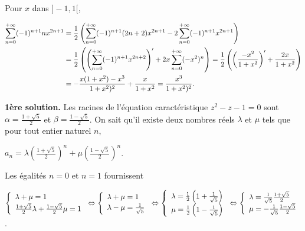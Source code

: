 {{Pour $x$ dans $]-1,1[$,

\begin{align*}\ensuremath
\sum_{n=0}^{+\infty}(-1)^{n+1}nx^{2n+1}&=\frac{1}{2}\left(\sum_{n=0}^{+\infty}(-1)^{n+1}(2n+2)x^{2n+1}-2\sum_{n=0}^{+\infty}(-1)^{n+1}x^{2n+1}\right)\\ 
 &=\frac{1}{2}\left(\left(\sum_{n=0}^{+\infty}(-1)^{n+1}x^{2n+2}\right)'+2x\sum_{n=0}^{+\infty}(-x^2)^n\right)=\frac{1}{2}\left(\left(\frac{-x^2}{1+x^2}\right)'+\frac{2x}{1+x^2}\right)\\
 &= -\frac{x(1+x^2)-x^3}{1+x^2)^2}+\frac{x}{1+x^2}=\frac{x^3}{1+x^2)^2}.
\end{align*}

\begin{center}
\fbox{
$\forall x\in]-1,1[$, $\sum_{n=0}^{+\infty}(-1)^{n+1}nx^{2n+1}=\frac{x^3}{1+x^2)^2}$.
}
\end{center}
\textbf{1ère solution.} Les racines de l'équation caractéristique $z^2 - z - 1 = 0$ sont $\alpha=\frac{1+\sqrt{5}}{2}$ et $\beta=\frac{1-\sqrt{5}}{2}$. On sait qu'il existe deux nombres réels $\lambda$ et $\mu$ tels que pour tout entier naturel $n$,

\begin{center}
$a_n =\lambda\left(\frac{1+\sqrt{5}}{2}\right)^n+\mu\left(\frac{1-\sqrt{5}}{2}\right)^n$.
\end{center}

Les égalités $n=0$ et $n=1$ fournissent

\begin{center}
$\left\{
\begin{array}{l}
\rule[-2mm]{0mm}{0mm}\lambda+\mu=1\\
\frac{1+\sqrt{5}}{2}\lambda+\frac{1-\sqrt{5}}{2}\mu=1
\end{array}
\right.\Leftrightarrow\left\{
\begin{array}{l}
\rule[-2mm]{0mm}{0mm}\lambda+\mu=1\\
\lambda-\mu=\frac{1}{\sqrt{5}}
\end{array}
\right.\Leftrightarrow
\left\{
\begin{array}{l}
\lambda=\frac{1}{2}\left(1+\frac{1}{\sqrt{5}}\right)\\
\mu=\frac{1}{2}\left(1-\frac{1}{\sqrt{5}}\right)\end{array}
\right.\Leftrightarrow\left\{
\begin{array}{l}
\lambda=\frac{1}{\sqrt{5}}\frac{1+\sqrt{5}}{2}\\
\mu=-\frac{1}{\sqrt{5}}\frac{1-\sqrt{5}}{2}
\end{array}
\right.$.
\end{center}

}}
